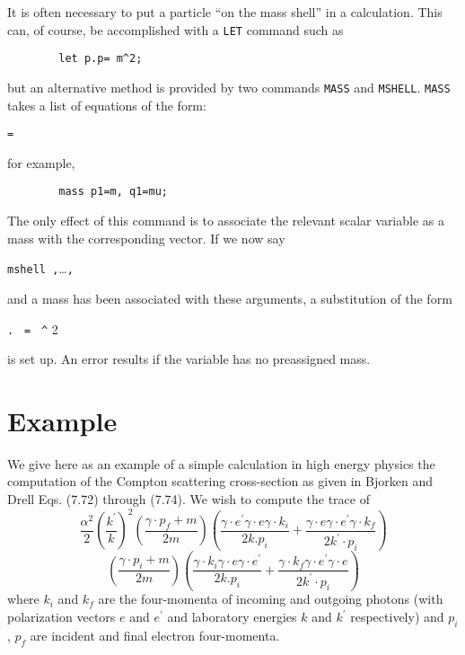 It is often necessary to put a particle ``on the mass shell'' in a
calculation.  This can, of course, be accomplished with a \texttt{LET}
command such as
\begin{verbatim}
        let p.p= m^2;
\end{verbatim}
but an alternative method is provided by two commands \texttt{MASS} and
\texttt{MSHELL}.
\texttt{MASS} takes a list of equations of the form:
\begin{syntax}
     \texttt{=} 
\end{syntax}
for example,
\begin{verbatim}
        mass p1=m, q1=mu;
\end{verbatim}
The only effect of this command is to associate the relevant scalar
variable as a mass with the corresponding vector. If we now say
\begin{syntax}
   \texttt{mshell }\texttt{,}\dots\texttt{,}
\end{syntax}
and a mass has been associated with these arguments, a substitution of the
form
\begin{syntax}
    \texttt{.} \texttt{ = }
       \texttt{\textasciicircum} 2
\end{syntax}
is set up. An error results if the variable has no preassigned mass.

\section{Example}

We give here as an example of a simple calculation in high energy physics
the computation of the Compton scattering cross-section as given in
Bjorken and Drell Eqs. (7.72) through (7.74). We wish to compute the trace of
\begin{displaymath}
\frac{\alpha^2}{2} \left(\frac{k^\prime}{k}\right)^2
 \left(\frac{\gamma\cdot p_f+m}{2m}\right)\left(\frac{\gamma\cdot e^\prime \gamma\cdot e
 \gamma\cdot k_i}{2k.p_i} + \frac{\gamma\cdot e\gamma\cdot e^\prime
 \gamma\cdot k_f}{2k^\prime\cdot p_i}\right)
\end{displaymath}
\begin{displaymath}
 \left(\frac{\gamma\cdot p_i+m}{2m}\right)
 \left(\frac{\gamma\cdot k_i\gamma\cdot e\gamma\cdot e^\prime}{2k.p_i} +
 \frac{\gamma\cdot k_f\gamma\cdot e^\prime\gamma\cdot e}{2k^\prime\cdot p_i}
 \right)
\end{displaymath}
where $k_i$ and $k_f$ are the four-momenta of incoming and outgoing photons
(with polarization vectors $e$ and $e^\prime$ and laboratory energies 
$k$ and $k^\prime$
respectively) and $p_i$, $p_f$ are incident and final electron four-momenta.

